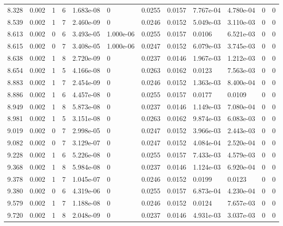 \documentclass[preview]{standalone}
\begin{document}
{{{{\begin{tabular}{L{1.2cm}C{1.2cm} C{0.3cm}C{0.5cm} C{1.4cm}C{1.4cm} C{1.4cm}C{1.4cm} C{1.6cm}C{1.6cm} C{1.6cm}C{1.6cm}}
  8.328  &  0.002  & 1     &  6 &  1.683e-08  & 0  &  0.0255&   0.0157& 7.767e-04 & 4.780e-04   &  0 & 0  \\ 
  8.539  &  0.002  & 1     &  7 &  2.460e-09  & 0  &  0.0246&   0.0152& 5.049e-03 & 3.110e-03   &  0 & 0  \\ 
  8.613  &  0.002  & 0     &  6 &  3.493e-05  & 1.000e-06  &  0.0255&   0.0157& 0.0106 & 6.521e-03   &  0 & 0  \\ 
  8.615  &  0.002  & 0     &  7 &  3.408e-05  & 1.000e-06  &  0.0247&   0.0152& 6.079e-03 & 3.745e-03   &  0 & 0  \\ 
  8.638  &  0.002  & 1     &  8 &  2.720e-09  & 0  &  0.0237&   0.0146& 1.967e-03 & 1.212e-03   &  0 & 0  \\ 
  8.654  &  0.002  & 1     &  5 &  4.166e-08  & 0  &  0.0263&   0.0162& 0.0123 & 7.563e-03   &  0 & 0  \\ 
  8.883  &  0.002  & 1     &  7 &  2.454e-09  & 0  &  0.0246&   0.0152& 1.363e-03 & 8.400e-04   &  0 & 0  \\ 
  8.886  &  0.002  & 1     &  6 &  4.457e-08  & 0  &  0.0255&   0.0157& 0.0177 & 0.0109   &  0 & 0  \\ 
  8.949  &  0.002  & 1     &  8 &  5.873e-08  & 0  &  0.0237&   0.0146& 1.149e-03 & 7.080e-04   &  0 & 0  \\ 
  8.981  &  0.002  & 1     &  5 &  3.151e-08  & 0  &  0.0263&   0.0162& 9.874e-03 & 6.083e-03   &  0 & 0  \\ 
  9.019  &  0.002  & 0     &  7 &  2.998e-05  & 0  &  0.0247&   0.0152& 3.966e-03 & 2.443e-03   &  0 & 0  \\ 
  9.082  &  0.002  & 0     &  7 &  3.129e-07  & 0  &  0.0247&   0.0152& 4.084e-04 & 2.520e-04   &  0 & 0  \\ 
  9.228  &  0.002  & 1     &  6 &  5.226e-08  & 0  &  0.0255&   0.0157& 7.433e-03 & 4.579e-03   &  0 & 0  \\ 
  9.368  &  0.002  & 1     &  8 &  5.984e-08  & 0  &  0.0237&   0.0146& 1.124e-03 & 6.920e-04   &  0 & 0  \\ 
  9.378  &  0.002  & 1     &  7 &  1.045e-07  & 0  &  0.0246&   0.0152& 0.0199 & 0.0123   &  0 & 0  \\ 
  9.380  &  0.002  & 0     &  6 &  4.319e-06  & 0  &  0.0255&   0.0157& 6.873e-04 & 4.230e-04   &  0 & 0  \\ 
  9.579  &  0.002  & 1     &  7 &  1.188e-08  & 0  &  0.0246&   0.0152& 0.0124 & 7.657e-03   &  0 & 0  \\ 
  9.720  &  0.002  & 1     &  8 &  2.048e-09  & 0  &  0.0237&   0.0146& 4.931e-03 & 3.037e-03   &  0 & 0  \\ 

\end{tabular}}}}}
\end{document}
